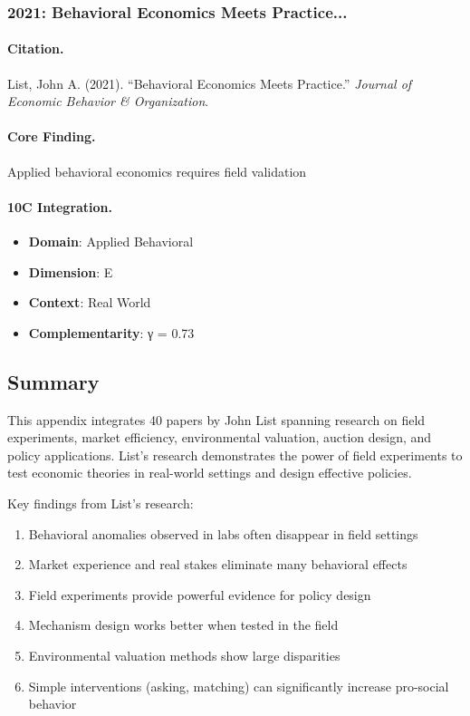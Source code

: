 \subsubsection{2021: Behavioral Economics Meets Practice...}

\paragraph{Citation.}
List, John A. (2021). ``Behavioral Economics Meets Practice.''
\textit{Journal of Economic Behavior & Organization}.

\paragraph{Core Finding.}
Applied behavioral economics requires field validation

\paragraph{10C Integration.}
\begin{itemize}[nosep]
  \item \textbf{Domain}: Applied Behavioral
  \item \textbf{Dimension}: E
  \item \textbf{Context}: Real World
  \item \textbf{Complementarity}: γ = 0.73
\end{itemize}


\subsection{Summary}

This appendix integrates 40 papers by John List spanning research on
field experiments, market efficiency, environmental valuation, auction design, and policy applications.
List's research demonstrates the power of field experiments to test economic theories in real-world settings
and design effective policies.

Key findings from List's research:
\begin{enumerate}
  \item Behavioral anomalies observed in labs often disappear in field settings
  \item Market experience and real stakes eliminate many behavioral effects
  \item Field experiments provide powerful evidence for policy design
  \item Mechanism design works better when tested in the field
  \item Environmental valuation methods show large disparities
  \item Simple interventions (asking, matching) can significantly increase pro-social behavior
\end{enumerate}

